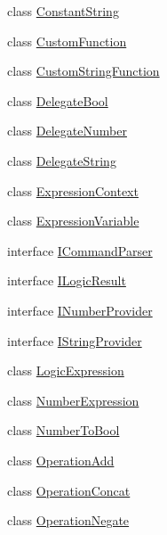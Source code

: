 \begin{DoxyCompactItemize}
\item 
class \hyperlink{class_b83_1_1_logic_expression_parser_1_1_constant_string}{Constant\+String}
\item 
class \hyperlink{class_b83_1_1_logic_expression_parser_1_1_custom_function}{Custom\+Function}
\item 
class \hyperlink{class_b83_1_1_logic_expression_parser_1_1_custom_string_function}{Custom\+String\+Function}
\item 
class \hyperlink{class_b83_1_1_logic_expression_parser_1_1_delegate_bool}{Delegate\+Bool}
\item 
class \hyperlink{class_b83_1_1_logic_expression_parser_1_1_delegate_number}{Delegate\+Number}
\item 
class \hyperlink{class_b83_1_1_logic_expression_parser_1_1_delegate_string}{Delegate\+String}
\item 
class \hyperlink{class_b83_1_1_logic_expression_parser_1_1_expression_context}{Expression\+Context}
\item 
class \hyperlink{class_b83_1_1_logic_expression_parser_1_1_expression_variable}{Expression\+Variable}
\item 
interface \hyperlink{interface_b83_1_1_logic_expression_parser_1_1_i_command_parser}{I\+Command\+Parser}
\item 
interface \hyperlink{interface_b83_1_1_logic_expression_parser_1_1_i_logic_result}{I\+Logic\+Result}
\item 
interface \hyperlink{interface_b83_1_1_logic_expression_parser_1_1_i_number_provider}{I\+Number\+Provider}
\item 
interface \hyperlink{interface_b83_1_1_logic_expression_parser_1_1_i_string_provider}{I\+String\+Provider}
\item 
class \hyperlink{class_b83_1_1_logic_expression_parser_1_1_logic_expression}{Logic\+Expression}
\item 
class \hyperlink{class_b83_1_1_logic_expression_parser_1_1_number_expression}{Number\+Expression}
\item 
class \hyperlink{class_b83_1_1_logic_expression_parser_1_1_number_to_bool}{Number\+To\+Bool}
\item 
class \hyperlink{class_b83_1_1_logic_expression_parser_1_1_operation_add}{Operation\+Add}
\item 
class \hyperlink{class_b83_1_1_logic_expression_parser_1_1_operation_concat}{Operation\+Concat}
\item 
class \hyperlink{class_b83_1_1_logic_expression_parser_1_1_operation_negate}{Operation\+Negate}

\end{DoxyCompactItemize}
